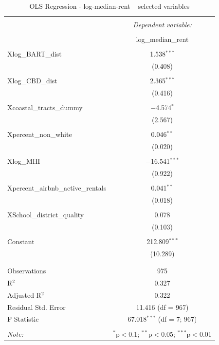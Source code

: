 \documentclass[10pt, letterpaper]{amsart}
\begin{document}
\begin{table}[!htbp] \centering 
  \caption{OLS Regression - log-median-rent ~ selected variables} 
  \label{} 
  \begin{tabular}{@{\extracolsep{5pt}}lc} 
    \\[-1.8ex]\hline 
    \hline \\[-1.8ex] 
    & \multicolumn{1}{c}{\textit{Dependent variable:}} \\ 
    \cline{2-2} 
    \\[-1.8ex] & log\_median\_rent \\ 
    \hline \\[-1.8ex] 
    Xlog\_BART\_dist & 1.538$^{***}$ \\ 
    & (0.408) \\ 
    & \\ 
    Xlog\_CBD\_dist & 2.365$^{***}$ \\ 
    & (0.416) \\ 
    & \\ 
    Xcoastal\_tracts\_dummy & $-$4.574$^{*}$ \\ 
    & (2.567) \\ 
    & \\ 
    Xpercent\_non\_white & 0.046$^{**}$ \\ 
    & (0.020) \\ 
    & \\ 
    Xlog\_MHI & $-$16.541$^{***}$ \\ 
    & (0.922) \\ 
    & \\ 
    Xpercent\_airbnb\_active\_rentals & 0.041$^{**}$ \\ 
    & (0.018) \\ 
    & \\ 
    XSchool\_district\_quality & 0.078 \\ 
    & (0.103) \\ 
    & \\ 
    Constant & 212.809$^{***}$ \\ 
    & (10.289) \\ 
    & \\ 
    \hline \\[-1.8ex] 
    Observations & 975 \\ 
    R$^{2}$ & 0.327 \\ 
    Adjusted R$^{2}$ & 0.322 \\ 
    Residual Std. Error & 11.416 (df = 967) \\ 
    F Statistic & 67.018$^{***}$ (df = 7; 967) \\ 
    \hline 
    \hline \\[-1.8ex] 
    \textit{Note:}  & \multicolumn{1}{r}{$^{*}$p$<$0.1; $^{**}$p$<$0.05; $^{***}$p$<$0.01} \\ 
  \end{tabular} 
\end{table}
\end{document}
